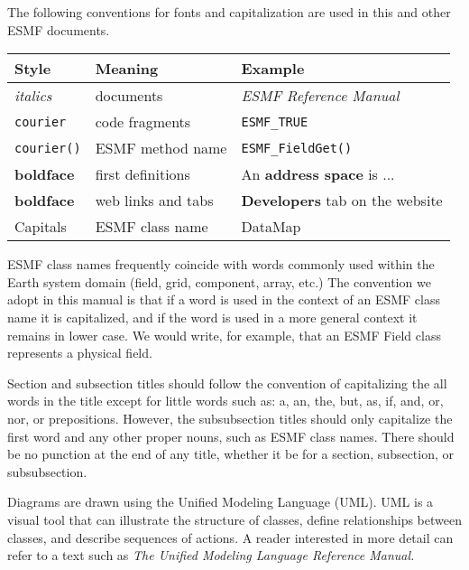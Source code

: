 
The following conventions for fonts and capitalization are used
in this and other ESMF documents. \newline

\begin{tabular}{lll}
{\bf Style} & {\bf Meaning} & {\bf Example} \\ \hline
{\it italics}  & documents & {\it ESMF Reference Manual}\\
{\tt courier}  & code fragments & {\tt ESMF\_TRUE}\\
{\tt courier()}  & ESMF method name & {\tt ESMF\_FieldGet()} \\
{\bf boldface} & first definitions & An {\bf address space} is ...\\
{\bf boldface} & web links and tabs & {\bf Developers} tab on the website \\
{Capitals}     & ESMF class name & DataMap \\
\end{tabular} 
 
ESMF class names frequently coincide with words commonly
used within the Earth system domain (field, grid, component, array, 
etc.)  The convention we adopt in this manual is that if a word is 
used in the context of an ESMF class name it is capitalized, and 
if the word is used in a more general context it remains in lower 
case.  We would write, for example, that an ESMF Field class 
represents a physical field.  

Section and subsection titles should follow the convention of capitalizing
the all words in the title except for little words such as: a, an, the, but, 
as, if, and, or, nor, or prepositions.  However, the subsubsection titles 
should only capitalize the first word and any other proper nouns, such as 
ESMF class names.  There should be no punction at the end of any title, whether 
it be for a section, subsection, or subsubsection.

Diagrams are drawn using the Unified Modeling Language (UML).  UML 
is a visual tool that can illustrate the structure of 
classes, define relationships between classes, and describe sequences
of actions.  A reader interested in more detail can refer to a 
text such as {\it The Unified Modeling Language Reference Manual.}
 \cite{uml}

